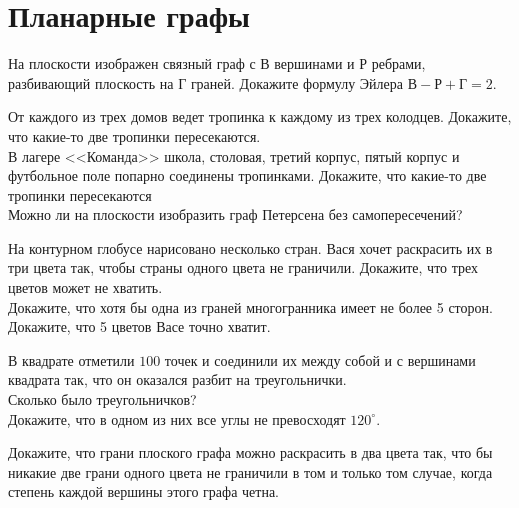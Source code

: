

\section*{Планарные графы}


\begin{problems}


\item
На плоскости изображен связный граф с $\text{В}$ вершинами и
$\text{Р}$ ребрами, разбивающий плоскость на $\text{Г}$ граней.
Докажите формулу Эйлера $\text{В} - \text{Р} + \text{Г} = 2$.

\item
\sbp
От каждого из трех домов ведет тропинка к каждому из трех колодцев.
Докажите, что какие-то две тропинки пересекаются.
\\
\sbp
В лагере <<Команда>> школа, столовая, третий корпус, пятый корпус и
футбольное поле попарно соединены тропинками.
Докажите, что какие-то две тропинки пересекаются
\\
\sbp\label{problem:draw-peterson}%
Можно ли на плоскости изобразить граф Петерсена
без самопересечений?
%
\begin{center}
\end{center}

\item
\sbp
На контурном глобусе нарисовано несколько стран.
Вася хочет раскрасить их в три цвета так, чтобы страны одного цвета не
граничили.
Докажите, что трех цветов может не хватить.
\\
\sbp
Докажите, что хотя бы одна из граней многогранника имеет не более 5 сторон.
\\
\sbp
Докажите, что 5 цветов Васе точно хватит.

\item
В квадрате отметили $100$ точек и соединили их между собой и с вершинами
квадрата так, что он оказался разбит на треугольнички.
\\
\sbp
Сколько было треугольничков?
\\
\sbp
Докажите, что в одном из них все углы не превосходят $120^\circ$.

\item
Докажите, что грани плоского графа можно раскрасить в два цвета так, что бы
никакие две грани одного цвета не граничили в том и только том случае, когда
степень каждой вершины этого графа четна.

\end{problems}

